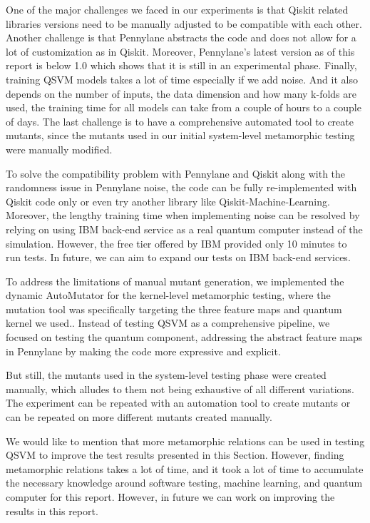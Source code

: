 \documentclass[12pt,a4paper]{article}
\begin{document}
	
	One of the major challenges we faced in our experiments is that Qiskit related libraries versions need to be manually adjusted to be compatible with each other. Another challenge is that Pennylane abstracts the code and does not allow for a lot of customization as in Qiskit. Moreover, Pennylane's latest version as of this report is below 1.0 which shows that it is still in an experimental phase. Finally, training QSVM models takes a lot of time especially if we add noise. And it also depends on the number of inputs, the data dimension and how many k-folds are used, the training time for all models can take from a couple of hours to a couple of days. The last challenge is to have a comprehensive automated tool to create mutants, since the mutants used in our initial system-level metamorphic testing were manually modified.
	
	To solve the compatibility problem with Pennylane and Qiskit along with the randomness issue in Pennylane noise, the code can be fully re-implemented with Qiskit code only or even try another library like Qiskit-Machine-Learning. Moreover, the lengthy training time when implementing noise can be resolved by relying on using IBM back-end service as a real quantum computer instead of the simulation. However, the free tier offered by IBM provided only 10 minutes to run tests. In future, we can aim to expand our tests on IBM back-end services.
	
	To address the limitations of manual mutant generation, we implemented the dynamic AutoMutator for the kernel-level metamorphic testing, where the mutation tool was specifically targeting the three feature maps and quantum kernel we used.. Instead of testing QSVM as a comprehensive pipeline, we focused on testing the quantum component, addressing the abstract feature maps in Pennylane by making the code more expressive and explicit.
	
	But still, the mutants used in the system-level testing phase were created manually, which alludes to them not being exhaustive of all different variations. The experiment can be repeated with an automation tool to create mutants or can be repeated on more different mutants created manually.
	
	We would like to mention that more metamorphic relations can be used in testing QSVM to improve the test results presented in this Section. However, finding metamorphic relations takes a lot of time, and it took a lot of time to accumulate the necessary knowledge around software testing, machine learning, and quantum computer for this report. However, in future we can work on improving the results in this report.
	
\end{document}
